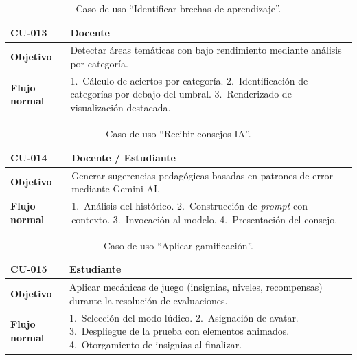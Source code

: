 \begin{table}[H]
\centering
\caption{Caso de uso ``Identificar brechas de aprendizaje''.}
\label{tab:cu_brechas}
\begin{small}
\begin{tabularx}{\textwidth}{|L{3cm}|X|}
\hline
{}
 CU-013 &  Docente\\
\hline
\textbf{Objetivo} & Detectar áreas temáticas con bajo rendimiento mediante análisis por categoría.\\
\hline
\textbf{Flujo normal} & 1.~Cálculo de aciertos por categoría. 2.~Identificación de categorías por debajo del umbral. 3.~Renderizado de visualización destacada.\\
\hline
\end{tabularx}
\end{small}
\fuenteautor
\end{table}

\begin{table}[H]
\centering
\caption{Caso de uso ``Recibir consejos IA''.}
\label{tab:cu_consejos}
\begin{small}
\begin{tabularx}{\textwidth}{|L{3cm}|X|}
\hline
{}
 CU-014 &  Docente / Estudiante\\
\hline
\textbf{Objetivo} & Generar sugerencias pedagógicas basadas en patrones de error mediante Gemini AI.\\
\hline
\textbf{Flujo normal} & 1.~Análisis del histórico. 2.~Construcción de \textit{prompt} con contexto. 3.~Invocación al modelo. 4.~Presentación del consejo.\\
\hline
\end{tabularx}
\end{small}
\fuenteautor
\end{table}

\begin{table}[H]
\centering
\caption{Caso de uso ``Aplicar gamificación''.}
\label{tab:cu_gamificacion}
\begin{small}
\begin{tabularx}{\textwidth}{|L{3cm}|X|}
\hline
{}
 CU-015 &  Estudiante\\
\hline
\textbf{Objetivo} & Aplicar mecánicas de juego (insignias, niveles, recompensas) durante la resolución de evaluaciones.\\
\hline
\textbf{Flujo normal} & 1.~Selección del modo lúdico. 2.~Asignación de avatar. 3.~Despliegue de la prueba con elementos animados. 4.~Otorgamiento de insignias al finalizar.\\
\hline
\end{tabularx}
\end{small}
\fuenteautor
\end{table}

